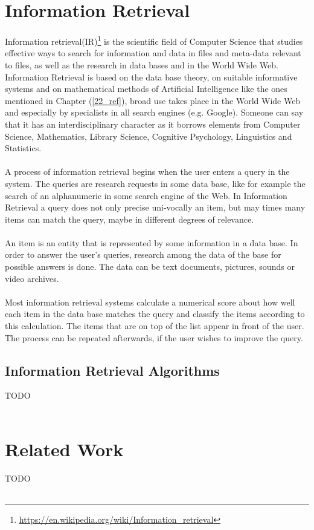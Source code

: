 \section{Information Retrieval}\label{23_ref}
Information retrieval(IR)\footnote{\url{https://en.wikipedia.org/wiki/Information_retrieval}} is the scientific field of Computer Science that studies effective ways to search for information and data in files and meta-data relevant to files, as well as the research in data bases and in the World Wide Web. Information Retrieval is based on the data base theory, on suitable informative systems and on mathematical methods of Artificial Intelligence like the ones mentioned in Chapter (\ref{22_ref}), broad use takes place in the World Wide Web and especially by specialists in all search engines (e.g. Google). Someone can say that it has an interdisciplinary character as it borrows elements from Computer Science, Mathematics, Library Science, Cognitive Psychology, Linguistics and Statistics.\\
\\
A process of information retrieval begins when the user enters a query in the system. The queries are research requests in some data base, like for example the search of an alphanumeric in some search engine of the Web. In Information Retrieval a query does not only precise uni-vocally an item, but may times many items can match the query, maybe in different degrees of relevance.\\
\\
An item is an entity that is represented by some information in a data base. In order to answer the user's queries, research among the data of the base for possible answers is done. The data can be text documents, pictures, sounds or video archives.\\
\\
Most information retrieval systems calculate a numerical score about how well each item in the data base matches the query and classify the items according to this calculation. The items that are on top of the list appear in front of the user. The process can be repeated afterwards, if the user wishes to improve the query.

\subsection{Information Retrieval Algorithms}\label{231_ref}
TODO\\
\\
\section{Related Work}\label{24_ref}
TODO\\
\\

